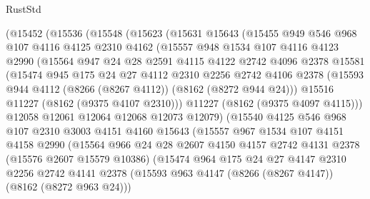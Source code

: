 \begin{lexlean}{RustStd}
\begin{coremodule}
    (@15452
      (@15536
        (@15548
          (@15623
            (@15631
              @15643
              (@15455
                @949
                @546
                @968
                @107
                @4116
                @4125
                @2310
                @4162
                (@15557
                  @948
                  @1534
                  @107
                  @4116
                  @4123
                  @2990
                  (@15564
                    @947
                    @24
                    @28
                    @2591
                    @4115
                    @4122
                    @2742
                    @4096
                    @2378
                    @15581
                    (@15474
                      @945
                      @175
                      @24
                      @27
                      @4112
                      @2310
                      @2256
                      @2742
                      @4106
                      @2378
                      (@15593 @944 @4112 (@8266 (@8267 @4112)) (@8162 (@8272 @944 @24)))
                      @15516
                      @11227
                      (@8162 (@9375 @4107 @2310)))
                    @11227
                    (@8162 (@9375 @4097 @4115)))
                  @12058
                  @12061
                  @12064
                  @12068
                  @12073
                  @12079)
                (@15540
                  @4125
                  @546
                  @968
                  @107
                  @2310
                  @3003
                  @4151
                  @4160
                  @15643
                  (@15557
                    @967
                    @1534
                    @107
                    @4151
                    @4158
                    @2990
                    (@15564
                      @966
                      @24
                      @28
                      @2607
                      @4150
                      @4157
                      @2742
                      @4131
                      @2378
                      (@15576 @2607 @15579 @10386)
                      (@15474
                        @964
                        @175
                        @24
                        @27
                        @4147
                        @2310
                        @2256
                        @2742
                        @4141
                        @2378
                        (@15593 @963 @4147 (@8266 (@8267 @4147)) (@8162 (@8272 @963 @24)))

\end{coremodule}
\end{lexlean}
